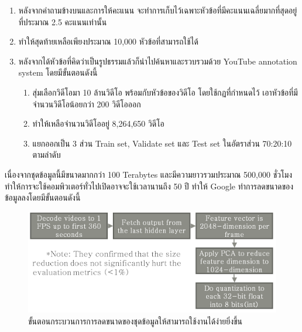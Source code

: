 \begin{enumerate}
\begin{enumerate}
		\item หลังจากคำถามข้างบนและการให้คะแนน จะทำการเก็บไว้เฉพาะหัวข้อที่มีคะแนนเฉลี่ยมากที่สุดอยู่ที่ประมาณ 2.5 คะแนนเท่านั้น
		\item ทำให้สุดท้ายเหลือเพียงประมาณ 10,000 หัวข้อที่สามารถใช้ได้
		\item หลังจากได้หัวข้อที่คิดว่าเป็นรูปธรรมแล้วก็นำไปค้นหาและรวบรวมด้วย YouTube annotation system โดยมีขั้นตอนดังนี้
		\begin{enumerate}
			\setlength\itemsep{-0.25em}
			\item สุ่มเลือกวิดีโอมา 10 ล้านวิดีโอ พร้อมกับหัวข้อของวิดีโอ โดยใช้กฏที่กำหนดไว้ เอาหัวข้อที่มีจำนวนวิดีโอน้อยกว่า 200 วิดีโอออก
			\item ทำให้เหลือจำนวนวิดีโออยู่ 8,264,650 วิดีโอ
			\item แยกออกเป็น 3 ส่วน Train set, Validate set และ Test set ในอัตราส่วน 70:20:10 ตามลำดับ
		\end{enumerate}
	\end{enumerate}
\end{enumerate}

เนื่องจากชุดข้อมูลนี้มีขนาดมากกว่า 100 Terabytes และมีความยาวรวมประมาณ 500,000 ชั่วโมง ทำให้การจะใช้คอมพิวเตอร์ทั่วไปเปิดอาจจะใช้เวลานานถึง 50 ปี ทำให้ Google ทำการลดขนาดของข้อมูลลงโดยมีขั้นตอนดังนี้
\begin{figure}[!ht]
	\centering
	\includegraphics[width=1\textwidth]{chapter2/images/decrease_data.png}
		\caption{ขั้นตอนกระบวนการการลดขนาดของชุดข้อมูลให้สามารถใช้งานได้ง่ายยิ่งขึ้น}
    	\label{fig:decrease_data}
\end{figure}




